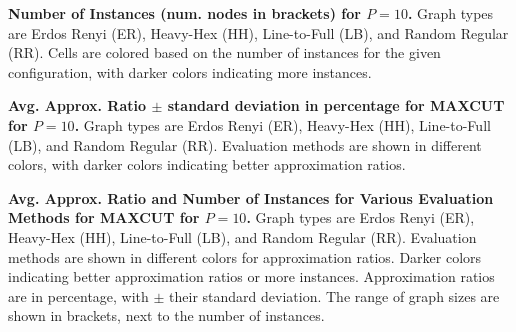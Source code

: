 \begin{table}[H]
    \centering
    
    \caption{\textbf{Number of Instances (num. nodes in brackets) for $P=10$.} Graph types are Erdos Renyi (ER), Heavy-Hex (HH), Line-to-Full (LB), and Random Regular (RR). Cells are colored based on the number of instances for the given configuration, with darker colors indicating more instances.}
\end{table}
\clearpage
\begin{table}[H]
    \centering
    
    \caption{\textbf{Avg. Approx. Ratio $\pm$ standard deviation in percentage for MAXCUT for $P=10$.} Graph types are Erdos Renyi (ER), Heavy-Hex (HH), Line-to-Full (LB), and Random Regular (RR). Evaluation methods are shown in different colors, with darker colors indicating better approximation ratios.}
\end{table}
\clearpage
\begin{table}[H]
    \centering
    
    \caption{\textbf{Avg. Approx. Ratio and Number of Instances for Various Evaluation Methods for MAXCUT for $P=10$.} Graph types are Erdos Renyi (ER), Heavy-Hex (HH), Line-to-Full (LB), and Random Regular (RR). Evaluation methods are shown in different colors for approximation ratios. Darker colors indicating better approximation ratios or more instances. Approximation ratios are in percentage, with $\pm$ their standard deviation. The range of graph sizes are shown in brackets, next to the number of instances.}
\end{table}
\clearpage